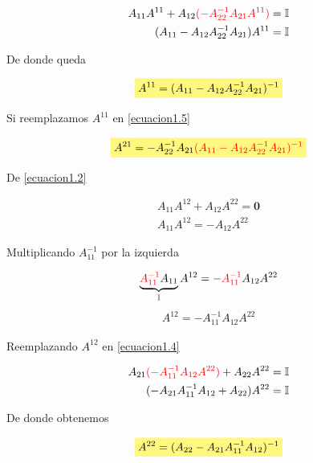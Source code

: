 \documentclass[12pt]{article}
\newcommand{\highlight}[2][yellow]{\mathchoice%
  {\colorbox{#1}{$\displaystyle#2$}}%
  {\colorbox{#1}{$\textstyle#2$}}%
  {\colorbox{#1}{$\scriptstyle#2$}}%
  {\colorbox{#1}{$\scriptscriptstyle#2$}}}%
\begin{document}
\begin{align*}
    A_{11}A^{11} + A_{12} \color{red}(-A_{22}^{-1}A_{21}A^{11})\color{black} = \mathbb{I} \\
    (A_{11} - A_{12}A_{22}^{-1}A_{21})A^{11} = \mathbb{I}
\end{align*}

De donde queda 

\begin{equation}\label{ecuacion1.6}
    \highlight[yellow!50!white]{ A^{11} = (A_{11} - A_{12}A_{22}^{-1}A_{21})^{-1} }
\end{equation}

Si reemplazamos \color{red} $A^{11}$ \color{black} en \eqref{ecuacion1.5}

\begin{align*} 
    \highlight[yellow!50!white]{ A^{21} = -A_{22}^{-1}A_{21} \color{red} (A_{11} - A_{12}A_{22}^{-1}A_{21})^{-1}}
\end{align*}

De \eqref{ecuacion1.2} 

\begin{align*}
    A_{11}A^{12} + A_{12}A^{22} = \textbf{0} \\
    A_{11}A^{12} = -A_{12}A^{22}
\end{align*}

Multiplicando \color{red} $A_{11}^{-1}$ \color{black} por la izquierda

\begin{align*}
    \underbrace{\color{red} A_{11}^{-1} \color{black} A_{11}}_{\mathbb{I}}A^{12} = -\color{red} A_{11}^{-1} \color{black}A_{12}A^{22}
\end{align*}
\begin{align} \label{ecuacion1.7}
    A^{12} = -A_{11}^{-1}A_{12}A^{22}
\end{align}

Reemplazando \color{red} $A^{12}$ \color{black} en \eqref{ecuacion1.4}

\begin{align*}
    A_{21}\color{red}(-A_{11}^{-1}A_{12}A^{22})\color{black} + A_{22}A^{22} = \mathbb{I}\\
    (-A_{21}A_{11}^{-1}A_{12} + A_{22})A^{22} = \mathbb{I}
\end{align*}

De donde obtenemos 

\begin{equation}\label{ecuacion1.8}
    \highlight[yellow!50!white]{ A^{22} = (A_{22} - A_{21}A_{11}^{-1}A_{12} )^{-1}}
\end{equation}
\end{document}
